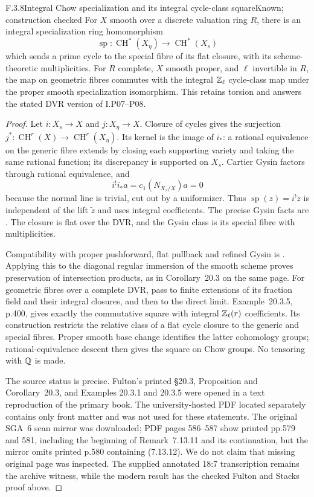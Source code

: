
\begin{result}{F.3.8}{Integral Chow specialization and its integral cycle-class square}{Known; construction checked}
For $X$ smooth over a discrete valuation ring $R$, there is an integral specialization ring homomorphism
\[
 \operatorname{sp}:\operatorname{CH}^*(X_\eta)
 \longrightarrow\operatorname{CH}^*(X_s)
\]
which sends a prime cycle to the special fibre of its flat closure, with its scheme-theoretic multiplicities. For $R$ complete, $X$ smooth proper, and $\ell$ invertible in $R$, the map on geometric fibres commutes with the integral $\mathbb Z_\ell$ cycle-class map under the proper smooth specialization isomorphism. This retains torsion and answers the stated DVR version of I.P07--P08.
\end{result}
\begin{proof}
Let $i:X_s\to X$ and $j:X_\eta\to X$. Closure of cycles gives the surjection $j^*:\operatorname{CH}^r(X)\to\operatorname{CH}^r(X_\eta)$. Its kernel is the image of $i_*$: a rational equivalence on the generic fibre extends by closing each supporting variety and taking the same rational function; its discrepancy is supported on $X_s$. Cartier Gysin factors through rational equivalence, and
\[
 i^!i_*a=c_1(N_{X_s/X})a=0
\]
because the normal line is trivial, cut out by a uniformizer. Thus $\operatorname{sp}(z)=i^!\widetilde z$ is independent of the lift $\widetilde z$ and uses integral coefficients. The precise Gysin facts are \cite[Lemmas 42.30.2--42.30.3]{AuditStacksChow}. The closure is flat over the DVR, and the Gysin class is its special fibre with multiplicities.

Compatibility with proper pushforward, flat pullback and refined Gysin is \cite[Proposition 20.3, p.399]{AuditFulton1998}. Applying this to the diagonal regular immersion of the smooth scheme proves preservation of intersection products, as in Corollary~20.3 on the same page. For geometric fibres over a complete DVR, pass to finite extensions of its fraction field and their integral closures, and then to the direct limit. Example~20.3.5, p.400, gives exactly the commutative square with integral $\mathbb Z_\ell(r)$ coefficients. Its construction restricts the relative class of a flat cycle closure to the generic and special fibres. Proper smooth base change identifies the latter cohomology groups; rational-equivalence descent then gives the square on Chow groups. No tensoring with $\mathbb Q$ is made.

The source status is precise. Fulton's printed \S20.3, Proposition and Corollary~20.3, and Examples 20.3.1 and 20.3.5 were opened in a text reproduction of the primary book. The university-hosted PDF located separately contains only front matter and was not used for these statements. The original SGA~6 scan mirror \cite{AuditSGA6} was downloaded; PDF pages 586--587 show printed pp.579 and 581, including the beginning of Remark~7.13.11 and its continuation, but the mirror omits printed p.580 containing (7.13.12). We do not claim that missing original page was inspected. The supplied annotated 18:7 transcription remains the archive witness, while the modern result has the checked Fulton and Stacks proof above.
\end{proof}

